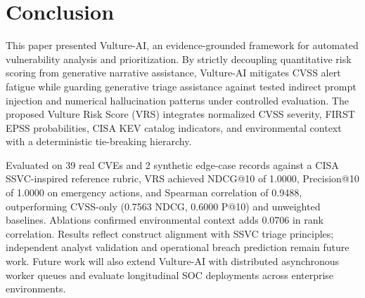\documentclass[conference]{IEEEtran}
\begin{document}
\section{Conclusion}
This paper presented Vulture-AI, an evidence-grounded framework for automated vulnerability analysis and prioritization. By strictly decoupling quantitative risk scoring from generative narrative assistance, Vulture-AI mitigates CVSS alert fatigue while guarding generative triage assistance against tested indirect prompt injection and numerical hallucination patterns under controlled evaluation. The proposed Vulture Risk Score (VRS) integrates normalized CVSS severity, FIRST EPSS probabilities, CISA KEV catalog indicators, and environmental context with a deterministic tie-breaking hierarchy.

Evaluated on 39 real CVEs and 2 synthetic edge-case records against a CISA SSVC-inspired reference rubric, VRS achieved NDCG@10 of 1.0000, Precision@10 of 1.0000 on emergency actions, and Spearman correlation of 0.9488, outperforming CVSS-only (0.7563 NDCG, 0.6000 P@10) and unweighted baselines. Ablations confirmed environmental context adds 0.0706 in rank correlation. Results reflect construct alignment with SSVC triage principles; independent analyst validation and operational breach prediction remain future work. Future work will also extend Vulture-AI with distributed asynchronous worker queues and evaluate longitudinal SOC deployments across enterprise environments.



\end{document}
